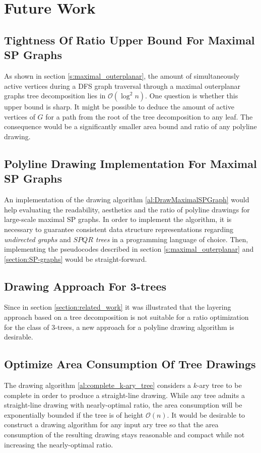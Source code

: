 \section{Future Work}\label{section:future_work}

\subsection*{Tightness Of Ratio Upper Bound For Maximal SP Graphs}

As shown in section \ref{s:maximal_outerplanar}, the amount of simultaneously active vertices during a DFS graph traversal through a maximal outerplanar graphs tree decomposition lies in $\mathcal{O}(\log^2 n)$. One question is whether this upper bound is sharp. It might be possible to deduce the amount of active vertices of $G$ for a path from the root of the tree decomposition to any leaf. The consequence would be a significantly smaller area bound and ratio of any polyline drawing.

\subsection*{Polyline Drawing Implementation For Maximal SP Graphs}

An implementation of the drawing algorithm \ref{al:DrawMaximalSPGraph} would help evaluating the readability, aesthetics and the ratio of polyline drawings for large-scale maximal SP graphs. In order to implement the algorithm, it is necessary to guarantee consistent data structure representations regarding \emph{undirected graphs} and \emph{$SPQR$ trees} in a programming language of choice. Then, implementing the pseudocodes described in section \ref{s:maximal_outerplanar} and \ref{section:SP-graphs} would be straight-forward.

\subsection*{Drawing Approach For 3-trees}

Since in section \ref{section:related_work} it was illustrated that the layering approach based on a tree decomposition is not suitable for a ratio optimization for the class of 3-trees, a new approach for a polyline drawing algorithm is desirable.

\subsection*{Optimize Area Consumption Of Tree Drawings}

The drawing algorithm \ref{al:complete_k-ary_tree} considers a $k$-ary tree to be complete in order to produce a straight-line drawing. While any tree admits a straight-line drawing with nearly-optimal ratio, the area consumption will be exponentially bounded if the tree is of height $\mathcal{O}(n)$. It would be desirable to construct a drawing algorithm for any input ary tree so that the area consumption of the resulting drawing stays reasonable and compact while not increasing the nearly-optimal ratio.